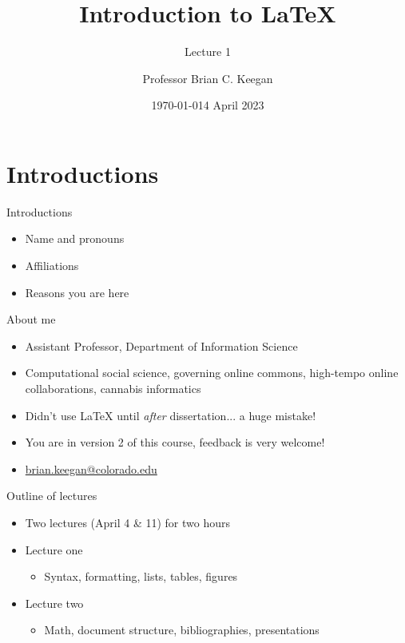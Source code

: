 \documentclass{cubeamer}
\title{Introduction to \LaTeX}
\subtitle{%
Lecture 1
}
\author[Brian Keegan]{Professor Brian C. Keegan}
\date{\today} %
\institute[Information Science]{Department of Information Science}
\date{4 April 2023}
\begin{document}
\maketitle


\section{Introductions}


\begin{frame}{Introductions}
    \begin{itemize}
        \item Name and pronouns
        \item Affiliations
        \item Reasons you are here
    \end{itemize}
\end{frame}

\begin{frame}{About me}
    \begin{itemize}
        \item Assistant Professor, Department of Information Science
        \item Computational social science, governing online commons, high-tempo online collaborations, cannabis informatics
        \item Didn't use \LaTeX{} until \textit{after} dissertation... a huge mistake!
        \item You are in version 2 of this course, feedback is very welcome!
        \item \href{mailto:brian.keegan@colorado.edu}{brian.keegan@colorado.edu}
    \end{itemize}
\end{frame}


\begin{frame}{Outline of lectures}
    \begin{itemize}
        \item Two lectures (April 4 \& 11) for two hours
        \item Lecture one
        \begin{itemize}
            \item Syntax, formatting, lists, tables, figures
        \end{itemize}
        \item Lecture two
        \begin{itemize}
            \item Math, document structure, bibliographies, presentations
        \end{itemize}
    \end{itemize}
\end{frame}
\end{document}
